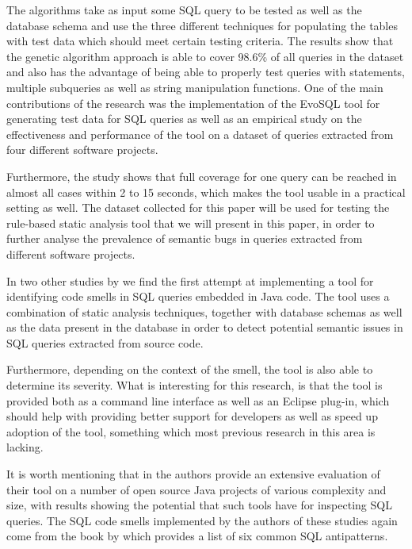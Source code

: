 The algorithms take as input some SQL query to be tested as well as the database schema and use the three different techniques for populating the tables with test data which should meet certain testing criteria. The results show that the genetic algorithm approach is able to cover 98.6\% of all queries in the dataset and also has the advantage of being able to properly test queries with  statements, multiple subqueries as well as string manipulation functions. One of the main contributions of the research was the implementation of the EvoSQL tool for generating test data for SQL queries as well as an empirical study on the effectiveness and performance of the tool on a dataset of queries extracted from four different software projects. 

Furthermore, the study shows that full coverage for one query can be reached in almost all cases within 2 to 15 seconds, which makes the tool usable in a practical setting as well. The dataset collected for this paper will be used for testing the rule-based static analysis tool that we will present in this paper, in order to further analyse the prevalence of semantic bugs in queries extracted from different software projects.

In two other studies by \citet{P013, P014} we find the first attempt at implementing a tool for identifying code smells in SQL queries embedded in Java code. The tool uses a combination of static analysis techniques, together with database schemas as well as the data present in the database in order to detect potential semantic issues in SQL queries extracted from source code. 

Furthermore, depending on the context of the smell, the tool is also able to determine its severity. What is interesting for this research, is that the tool is provided both as a command line interface as well as an Eclipse plug-in, which should help with providing better support for developers as well as speed up adoption of the tool, something which most previous research in this area is lacking. 

It is worth mentioning that in \citet{P014} the authors provide an extensive evaluation of their tool on a number of open source Java projects of various complexity and size, with results showing the potential that such tools have for inspecting SQL queries.
The SQL code smells implemented by the authors of these studies again come from the book by \citet{P998} which provides a list of six common SQL antipatterns. 

